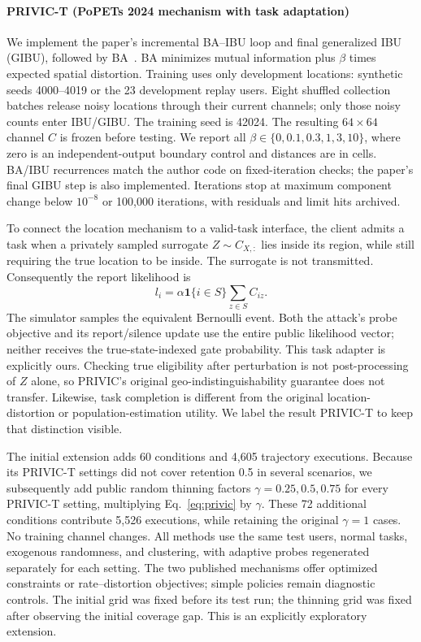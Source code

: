 \documentclass[review,12pt]{elsarticle}
\newcommand{\ind}{\mathbf{1}}
\begin{document}
\paragraph{PRIVIC-T (PoPETs 2024 mechanism with task adaptation)}
We implement the paper's incremental BA--IBU loop and final generalized IBU (GIBU), followed by BA~\cite{privic2024}. BA minimizes mutual information plus $\beta$ times expected spatial distortion. Training uses only development locations: synthetic seeds 4000--4019 or the 23 development replay users. Eight shuffled collection batches release noisy locations through their current channels; only those noisy counts enter IBU/GIBU. The training seed is 42024. The resulting $64\times64$ channel $C$ is frozen before testing. We report all $\beta\in\{0,0.1,0.3,1,3,10\}$, where zero is an independent-output boundary control and distances are in cells. BA/IBU recurrences match the author code on fixed-iteration checks; the paper's final GIBU step is also implemented. Iterations stop at maximum component change below $10^{-8}$ or 100,000 iterations, with residuals and limit hits archived.

To connect the location mechanism to a valid-task interface, the client admits a task when a privately sampled surrogate $Z\sim C_{X,:}$ lies inside its region, while still requiring the true location to be inside. The surrogate is not transmitted. Consequently the report likelihood is
\begin{equation}
 l_i=\alpha\ind\{i\in S\}\sum_{z\in S}C_{iz}.
\label{eq:privic}
\end{equation}
The simulator samples the equivalent Bernoulli event. Both the attack's probe objective and its report/silence update use the entire public likelihood vector; neither receives the true-state-indexed gate probability. This task adapter is explicitly ours. Checking true eligibility after perturbation is not post-processing of $Z$ alone, so PRIVIC's original geo-indistinguishability guarantee does not transfer. Likewise, task completion is different from the original location-distortion or population-estimation utility. We label the result PRIVIC-T to keep that distinction visible.

The initial extension adds 60 conditions and 4,605 trajectory executions. Because its PRIVIC-T settings did not cover retention 0.5 in several scenarios, we subsequently add public random thinning factors $\gamma=0.25,0.5,0.75$ for every PRIVIC-T setting, multiplying Eq.~\eqref{eq:privic} by $\gamma$. These 72 additional conditions contribute 5,526 executions, while retaining the original $\gamma=1$ cases. No training channel changes. All methods use the same test users, normal tasks, exogenous randomness, and clustering, with adaptive probes regenerated separately for each setting. The two published mechanisms offer optimized constraints or rate--distortion objectives; simple policies remain diagnostic controls. The initial grid was fixed before its test run; the thinning grid was fixed after observing the initial coverage gap. This is an explicitly exploratory extension.
\end{document}
